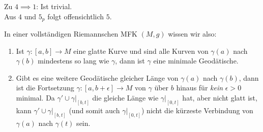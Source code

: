 \begin{beweis}
Zu $4 \implies 1$: Ist trivial.\\
Aus $4$ und $5_p$ folgt offensichtlich $5$.
\end{beweis}
In einer vollständigen Riemannschen MFK $(M,g)$ wissen wir also:
\begin{enumerate}
\item Ist $\gamma: [a,b] \to M$ eine glatte Kurve und sind alle Kurven von $\gamma(a)$ nach $\gamma(b)$ mindestens so lang wie $\gamma$, dann ist $\gamma$ eine minimale Geodätische.
\item Gibt es eine weitere Geodätische gleicher Länge von $\gamma(a)$ nach $\gamma(b)$, dann ist die Fortsetzung $\gamma: [a, b+\epsilon] \to M$ von $\gamma$ über $b$ hinaus für \textit{kein} $\epsilon > 0$ minimal. Da $\gamma' \cup \gamma|_{[b,t]}$ die gleiche Länge wie $\gamma|_{[0,t]}$ hat, aber nicht glatt ist, kann $\gamma' \cup \gamma|_{[b,t]}$ (und somit auch $\gamma|_{[0,t]}$) nicht die kürzeste Verbindung von $\gamma(a)$ nach $\gamma(t)$ sein.
\end{enumerate}
